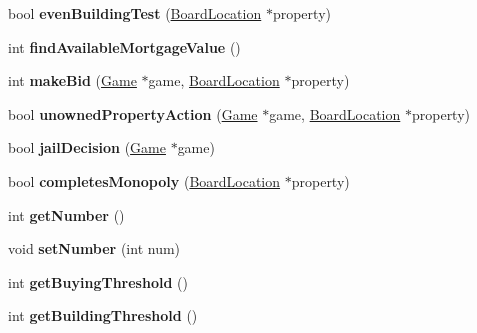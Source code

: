 \begin{DoxyCompactItemize}
\item 
\hypertarget{classPlayer_a8c4d75c424e0956fbb6b2a64bb934f76}{bool {\bfseries even\-Building\-Test} (\hyperlink{classBoardLocation}{Board\-Location} $\ast$property)}\label{classPlayer_a8c4d75c424e0956fbb6b2a64bb934f76}

\item 
\hypertarget{classPlayer_a93fc9c3953b6873ff7c7daf8d2687d7a}{int {\bfseries find\-Available\-Mortgage\-Value} ()}\label{classPlayer_a93fc9c3953b6873ff7c7daf8d2687d7a}

\item 
\hypertarget{classPlayer_a11952b3ec4a2ae91b43e5d8aba8448b5}{int {\bfseries make\-Bid} (\hyperlink{classGame}{Game} $\ast$game, \hyperlink{classBoardLocation}{Board\-Location} $\ast$property)}\label{classPlayer_a11952b3ec4a2ae91b43e5d8aba8448b5}

\item 
\hypertarget{classPlayer_a770b11ffc3b23ede523fd07de176f710}{bool {\bfseries unowned\-Property\-Action} (\hyperlink{classGame}{Game} $\ast$game, \hyperlink{classBoardLocation}{Board\-Location} $\ast$property)}\label{classPlayer_a770b11ffc3b23ede523fd07de176f710}

\item 
\hypertarget{classPlayer_a08a0fe5a71a7d882b04ad6d46d13a4ef}{bool {\bfseries jail\-Decision} (\hyperlink{classGame}{Game} $\ast$game)}\label{classPlayer_a08a0fe5a71a7d882b04ad6d46d13a4ef}

\item 
\hypertarget{classPlayer_a974f4f16f67fe6342e1c68cd0fd80ebd}{bool {\bfseries completes\-Monopoly} (\hyperlink{classBoardLocation}{Board\-Location} $\ast$property)}\label{classPlayer_a974f4f16f67fe6342e1c68cd0fd80ebd}

\item 
\hypertarget{classPlayer_a365f937ae0f3945ba03642a263bdee21}{int {\bfseries get\-Number} ()}\label{classPlayer_a365f937ae0f3945ba03642a263bdee21}

\item 
\hypertarget{classPlayer_a3881b61da0f76851156b0f94f8ee73c7}{void {\bfseries set\-Number} (int num)}\label{classPlayer_a3881b61da0f76851156b0f94f8ee73c7}

\item 
\hypertarget{classPlayer_af0cdf007369e42736b9b94b82e7509a7}{int {\bfseries get\-Buying\-Threshold} ()}\label{classPlayer_af0cdf007369e42736b9b94b82e7509a7}

\item 
\hypertarget{classPlayer_a3eec30c9985dd59ec6cf10916ccb3634}{int {\bfseries get\-Building\-Threshold} ()}\label{classPlayer_a3eec30c9985dd59ec6cf10916ccb3634}


\end{DoxyCompactItemize}
